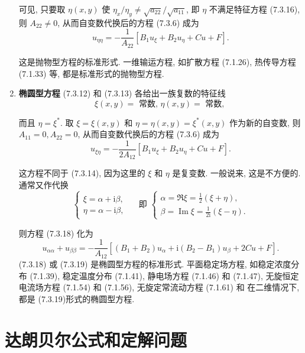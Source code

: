 \begin{enumerate}
可见, 只要取 $\eta(x, y)$ 使 $\eta_x / \eta_y \neq \sqrt{a_{22}} / \sqrt{a_{11}}$, 即 $\eta$ 不满足特征方程 (7.3.16), 则 $A_{22} \neq 0$, 从而自变数代换后的方程 (7.3.6) 成为
$$
u_{\eta \eta}=-\frac{1}{A_{22}}\left[B_1 u_{\xi}+B_2 u_\eta+C u+F\right] .
$$

这是抛物型方程的标准形式. 一维输运方程, 如扩散方程 (7.1.26), 热传导方程 (7.1.33) 等, 都是标准形式的抛物型方程.


\item \textbf{椭圆型方程}
(7.3.12) 和 (7.3.13) 各给出一族复数的特征线
$$
\xi(x, y)=\text { 常数, } \eta(x, y)=\text { 常数, }
$$

而且 $\eta=\xi^*$. 取 $\xi=\xi(x, y)$ 和 $\eta=\eta(x, y)=\xi^*(x, y)$ 作为新的自变数, 则 $A_{11}=0, A_{22}=0$, 从而自变数代换后的方程 (7.3.6) 成为
$$
u_{\xi \eta}=-\frac{1}{2 A_{12}}\left[B_1 u_{\xi}+B_2 u_\eta+C u+F\right] .
$$

这方程不同于 (7.3.14), 因为这里的 $\xi$ 和 $\eta$ 是复变数. 一般说来, 这是不方便的. 通常又作代换
$$
\left\{\begin{array} { l } 
{ \xi = \alpha + \mathrm { i } \beta , } \\
{ \eta = \alpha - \mathrm { i } \beta , }
\end{array} \quad \text { 即 } \left\{\begin{array}{l}
\alpha=\Re \xi=\frac{1}{2}(\xi+\eta), \\
\beta=\operatorname{Im} \xi=\frac{1}{2 \mathrm{i}}(\xi-\eta) .
\end{array}\right.\right.
$$

则方程 (7.3.18) 化为
$$
u_{\alpha \alpha}+u_{\beta \beta}=-\frac{1}{A_{12}}\left[\left(B_1+B_2\right) u_\alpha+\mathrm{i}\left(B_2-B_1\right) u_\beta+2 C u+F\right] .
$$
(7.3.18) 或 (7.3.19) 是椭圆型方程的标准形式. 平面稳定场方程, 如稳定浓度分布 (7.1.39), 稳定温度分布 (7.1.41), 静电场方程 (7.1.46) 和 (7.1.47), 无旋恒定电流场方程 (7.1.54) 和 (7.1.56), 无旋定常流动方程 (7.1.61) 和
在二维情况下, 都是 (7.3.19)形式的椭圆型方程.
\end{enumerate}


\section{达朗贝尔公式和定解问题}